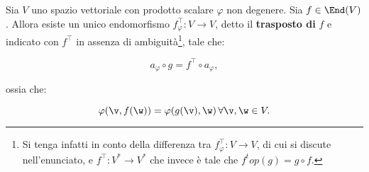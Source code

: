 \documentclass[11pt]{article}
\begin{document}
	\begin{proposition}
		Sia $V$ uno spazio vettoriale con prodotto scalare $\varphi$ non degenere.
		Sia $f \in \End(V)$. Allora esiste un unico endomorfismo
		$f_\varphi^\top : V \to V$, detto il \textbf{trasposto di} $f$ e indicato con $f^\top$ in assenza
		di ambiguità\footnote{Si tenga infatti in conto della differenza tra $f_\varphi^\top : V \to V$, di cui si discute
		nell'enunciato, e $f^\top : V^* \to V^*$ che invece è tale che $f^top(g) = g \circ f$.}, tale che:
		
		\[ a_\varphi \circ g = f^\top \circ a_\varphi, \]
		
		\vskip 0.05in
		
		ossia che:
		
		\[ \varphi(\v, f(\w)) = \varphi(g(\v), \w) \, \forall \v, \w \in V. \]
	\end{proposition}
	
\end{document}
